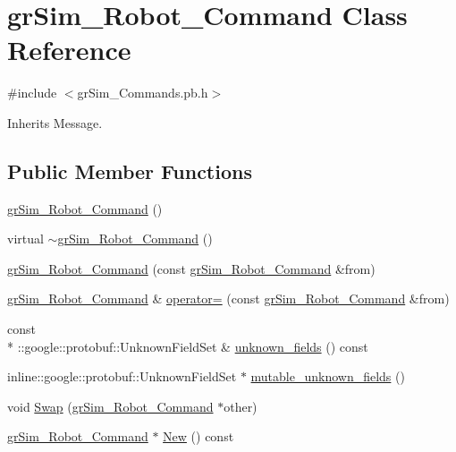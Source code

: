 \hypertarget{classgr_sim___robot___command}{\section{gr\-Sim\-\_\-\-Robot\-\_\-\-Command Class Reference}
\label{classgr_sim___robot___command}
}


{\ttfamily \#include $<$gr\-Sim\-\_\-\-Commands.\-pb.\-h$>$}



Inherits Message.

\subsection*{Public Member Functions}
\begin{DoxyCompactItemize}
\item 
\hyperlink{classgr_sim___robot___command_aa79dbe84aed7f2d16abbfaa19538b4c3}{gr\-Sim\-\_\-\-Robot\-\_\-\-Command} ()
\item 
virtual \hyperlink{classgr_sim___robot___command_a5a7bcdc67dbb546b414569241871e4b8}{$\sim$gr\-Sim\-\_\-\-Robot\-\_\-\-Command} ()
\item 
\hyperlink{classgr_sim___robot___command_a4b231e51f942934781cd23d67f64719f}{gr\-Sim\-\_\-\-Robot\-\_\-\-Command} (const \hyperlink{classgr_sim___robot___command}{gr\-Sim\-\_\-\-Robot\-\_\-\-Command} \&from)
\item 
\hyperlink{classgr_sim___robot___command}{gr\-Sim\-\_\-\-Robot\-\_\-\-Command} \& \hyperlink{classgr_sim___robot___command_af85dc1e664e661167a4109faed5bb99c}{operator=} (const \hyperlink{classgr_sim___robot___command}{gr\-Sim\-\_\-\-Robot\-\_\-\-Command} \&from)
\item 
const \\*
\-::google\-::protobuf\-::\-Unknown\-Field\-Set \& \hyperlink{classgr_sim___robot___command_a509fa7aded42ff363f775ddadccb4bfe}{unknown\-\_\-fields} () const 
\item 
inline\-::google\-::protobuf\-::\-Unknown\-Field\-Set $\ast$ \hyperlink{classgr_sim___robot___command_a03728ff14010b2c0bdeb247c05d6b9df}{mutable\-\_\-unknown\-\_\-fields} ()
\item 
void \hyperlink{classgr_sim___robot___command_a3308bdb23be31e83cb52dee2b25e000e}{Swap} (\hyperlink{classgr_sim___robot___command}{gr\-Sim\-\_\-\-Robot\-\_\-\-Command} $\ast$other)
\item 
\hyperlink{classgr_sim___robot___command}{gr\-Sim\-\_\-\-Robot\-\_\-\-Command} $\ast$ \hyperlink{classgr_sim___robot___command_ac13edb4caf4164a3ed90a7c24eaed5d4}{New} () const 

\end{DoxyCompactItemize}
